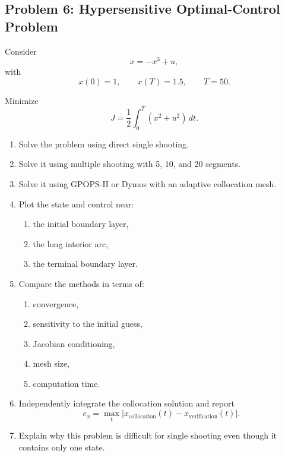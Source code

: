 \subsection*{Problem 6: Hypersensitive Optimal-Control Problem}

Consider
\begin{equation}
\dot{x}=-x^3+u,
\end{equation}
with
\begin{equation}
x(0)=1,
\qquad
x(T)=1.5,
\qquad
T=50.
\end{equation}

Minimize
\begin{equation}
J=
\frac{1}{2}
\int_0^T
\left(
x^2+u^2
\right)\,dt.
\end{equation}

\begin{enumerate}
    \item Solve the problem using direct single shooting.
    
    \item Solve it using multiple shooting with 5, 10, and 20 segments.
    
    \item Solve it using GPOPS-II or Dymos with an adaptive collocation mesh.
    
    \item Plot the state and control near:
    \begin{enumerate}
        \item the initial boundary layer,
        \item the long interior arc,
        \item the terminal boundary layer.
    \end{enumerate}
    
    \item Compare the methods in terms of:
    \begin{enumerate}
        \item convergence,
        \item sensitivity to the initial guess,
        \item Jacobian conditioning,
        \item mesh size,
        \item computation time.
    \end{enumerate}
    
    \item Independently integrate the collocation solution and report
    \begin{equation}
    e_x=
    \max_t
    \left|
    x_{\mathrm{collocation}}(t)
    -
    x_{\mathrm{verification}}(t)
    \right|.
    \end{equation}
    
    \item Explain why this problem is difficult for single shooting even though
    it contains only one state.
\end{enumerate}
